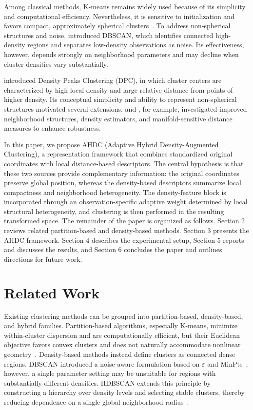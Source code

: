 \documentclass[10pt,twoside]{article}
\numberwithin{equation}{section}
\begin{document}
Among classical methods, K-means remains widely used because of its simplicity and computational efficiency. Nevertheless, it is sensitive to initialization and favors compact, approximately spherical clusters~\cite{Jain2010}. To address non-spherical structures and noise, \cite{Ester1996} introduced DBSCAN, which identifies connected high-density regions and separates low-density observations as noise. Its effectiveness, however, depends strongly on neighborhood parameters and may decline when cluster densities vary substantially.



\cite{Rodriguez2014} introduced Density Peaks Clustering (DPC), in which cluster centers are characterized by high local density and large relative distance from points of higher density. Its conceptual simplicity and ability to represent non-spherical structures motivated several extensions. \cite{Du2016} and \cite{Wang2025}, for example, investigated improved neighborhood structures, density estimators, and manifold-sensitive distance measures to enhance robustness.



In this paper, we propose AHDC (Adaptive Hybrid Density-Augmented Clustering), a representation framework that combines standardized original coordinates with local distance-based descriptors. The central hypothesis is that these two sources provide complementary information: the original coordinates preserve global position, whereas the density-based descriptors summarize local compactness and neighborhood heterogeneity. The density-feature block is incorporated through an observation-specific adaptive weight determined by local structural heterogeneity, and clustering is then performed in the resulting transformed space. The remainder of the paper is organized as follows. Section 2 reviews related partition-based and density-based methods. Section 3 presents the AHDC framework. Section 4 describes the experimental setup, Section 5 reports and discusses the results, and Section 6 concludes the paper and outlines directions for future work.



\section{Related Work}

Existing clustering methods can be grouped into partition-based, density-based, and hybrid families. Partition-based algorithms, especially K-means, minimize within-cluster dispersion and are computationally efficient, but their Euclidean objective favors convex clusters and does not naturally accommodate nonlinear geometry~\cite{Jain2010}. Density-based methods instead define clusters as connected dense regions. DBSCAN introduced a noise-aware formulation based on $\varepsilon$ and MinPts~\cite{Ester1996}; however, a single parameter setting may be unsuitable for regions with substantially different densities. HDBSCAN extends this principle by constructing a hierarchy over density levels and selecting stable clusters, thereby reducing dependence on a single global neighborhood radius~\cite{Campello2015}.
\end{document}
